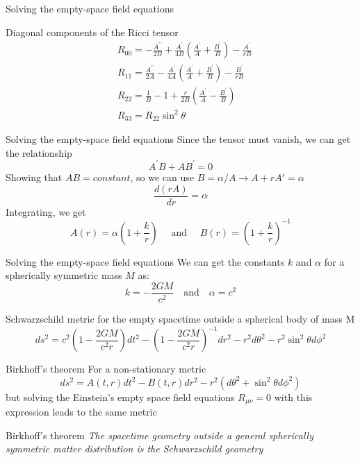 \documentclass[xcolor=dvipsnames]{beamer}
\begin{document}
\begin{frame}{Solving the empty-space field equations}
\begin{block}
{Diagonal components of the Ricci tensor}
$$
\begin{aligned}
&R_{00}=-\frac{A^{\prime \prime}}{2 B}+\frac{A^{\prime}}{4 B}\left(\frac{A^{\prime}}{A}+\frac{B^{\prime}}{B}\right)-\frac{A^{\prime}}{r B} \\
&R_{11}=\frac{A^{\prime \prime}}{2 A}-\frac{A^{\prime}}{4 A}\left(\frac{A^{\prime}}{A}+\frac{B^{\prime}}{B}\right)-\frac{B^{\prime}}{r B} \\
&R_{22}=\frac{1}{B}-1+\frac{r}{2 B}\left(\frac{A^{\prime}}{A}-\frac{B^{\prime}}{B}\right) \\
&R_{33}=R_{22} \sin ^{2} \theta
\end{aligned}
$$
\end{block}
\end{frame}

\begin{frame}{Solving the empty-space field equations}
Since the tensor must vanish, we can get the relationship
    $$
A^{\prime} B+A B^{\prime}=0
$$
Showing that $AB=constant$, so we can use $B=\alpha/A \rightarrow A+rA'=\alpha$
$$
\frac{d(r A)}{d r}=\alpha
$$
Integrating, we get
$$
A(r)=\alpha\left(1+\frac{k}{r}\right) \quad \text { and } \quad B(r)=\left(1+\frac{k}{r}\right)^{-1}
$$
\end{frame}
\begin{frame}{Solving the empty-space field equations}
    We can get the constants $k$ and $\alpha$ for a spherically symmetric mass $M$ as:
    $$k=-\frac{2GM}{c^2}\quad \text{and}\quad \alpha= c^2$$
    \begin{block}{Schwarzschild metric for the empty spacetime outside a spherical body of mass M}
    $$d s^{2}=c^{2}\left(1-\frac{2 G M}{c^{2} r}\right) d t^{2}-\left(1-\frac{2 G M}{c^{2} r}\right)^{-1} d r^{2}-r^{2} d \theta^{2}-r^{2} \sin ^{2} \theta d \phi^{2}$$
    \end{block}
\end{frame}
\begin{frame}{Birkhoff's theorem}
For a non-stationary metric
    $$
d s^{2}=A(t, r) d t^{2}-B(t, r) d r^{2}-r^{2}\left(d \theta^{2}+\sin ^{2} \theta d \phi^{2}\right)
$$
but solving the Einstein's empty space field equations $R_{\mu \nu}=0$ with this expression leads to the same metric
\begin{block}{Birkhoff's theorem}
\textit{The spacetime geometry outside a general
spherically symmetric matter distribution is the Schwarzschild geometry}
\end{block}
\end{frame}
\end{document}
